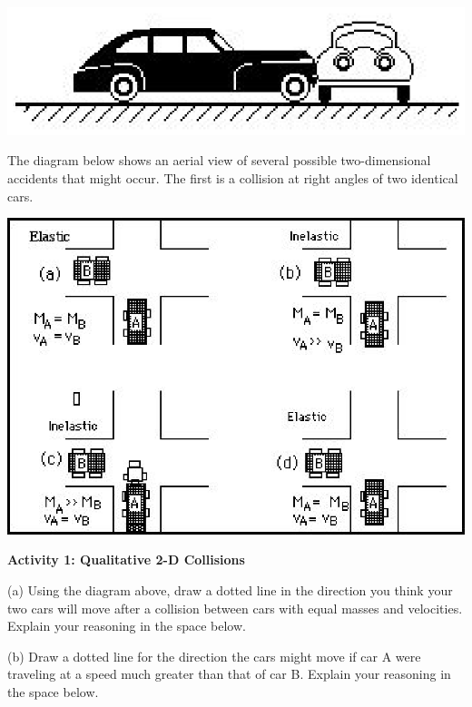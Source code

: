 \vspace{0.3cm}
{\par\centering \includegraphics{twod_collisions_fig1.eps} \par}
\vspace{0.3cm}

The diagram below shows an aerial view of several possible two-dimensional accidents
that might occur. The first is a collision at right angles of two identical
cars.

\vspace{0.3cm}
{\par\centering \includegraphics{twod_collisions_fig2.eps} \par}
\vspace{0.3cm}

\textbf{Activity 1: Qualitative 2-D Collisions }

(a) Using the diagram above, draw a dotted line in the direction you think your
two cars will move after a collision between cars with equal masses and velocities.
Explain your reasoning in the space below.
\vspace{20mm}

(b) Draw a dotted line for the direction the cars might move if car A were traveling
at a speed much greater than that of car B. Explain your reasoning in the space
below. 
\vspace{20mm}

